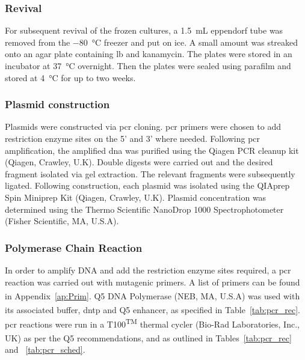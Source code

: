 \subsubsection{Revival}
For subsequent revival of the frozen cultures, a \SI{1.5}{\milli\liter} eppendorf tube was removed from the \SI{-80}{\celsius} freezer and put on ice. A small amount was streaked onto an agar plate containing \acrshort{lb} and kanamycin. The plates were stored in an incubator at \SI{37}{\celsius} overnight. Then the plates were sealed using parafilm and stored at \SI{4}{\celsius} for up to two weeks. 



\subsubsection{Plasmid construction}

Plasmids were constructed via \acrshort{pcr} cloning. \acrshort{pcr} primers were chosen to add restriction enzyme sites on the 5' and 3' where needed. Following \acrshort{pcr} amplification, the amplified \acrshort{dna} was purified using the Qiagen PCR cleanup kit (Qiagen, Crawley, U.K). Double digests were carried out and the desired fragment isolated via gel extraction. The relevant fragments were subsequently ligated. Following construction, each plasmid was isolated using the QIAprep Spin Miniprep Kit (Qiagen, Crawley, U.K). Plasmid concentration was determined using the Thermo Scientific NanoDrop 1000 Spectrophotometer (Fisher Scientific, MA, U.S.A).

\subsubsection{Polymerase Chain Reaction}
\label{sec:pcr}
In order to amplify DNA and add the restriction enzyme sites required, a \acrfull{pcr} reaction was carried out with mutagenic primers. A list of primers can be found in Appendix~\ref{ap:Prim}. Q5\textsuperscript{\textregistered} DNA Polymerase (NEB, MA, U.S.A) was used with its associated buffer, \acrshort{dntp} and Q5\textsuperscript{\textregistered} enhancer, as specified in Table~\ref{tab:pcr_rec}. \acrshort{pcr} reactions were run in a T100\textsuperscript{TM} thermal cycler (Bio-Rad Laboratories, Inc., UK) as per the Q5\textsuperscript{\textregistered} recommendations, and as outlined in Tables~\ref{tab:pcr_rec} and ~\ref{tab:pcr_sched}.


